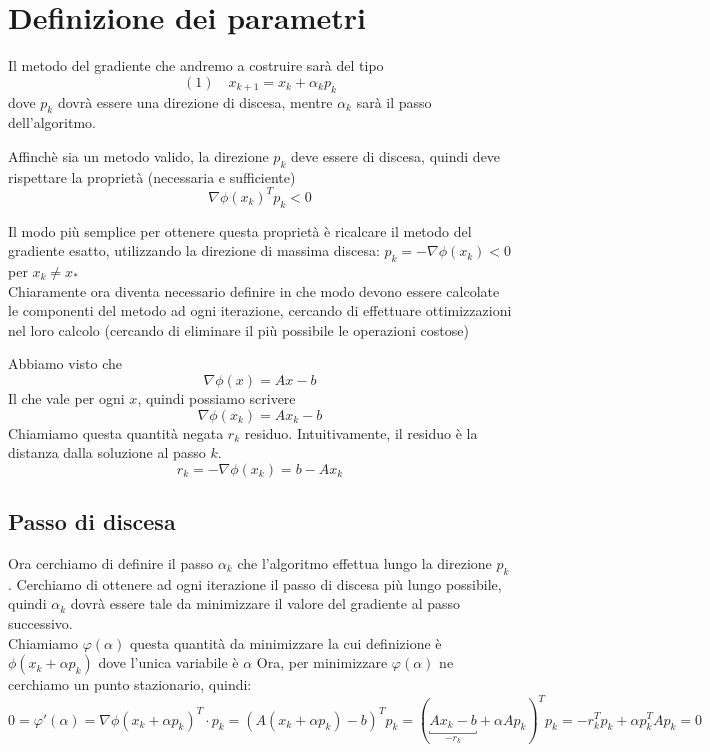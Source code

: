 \section{Definizione dei parametri} Il metodo del gradiente che
andremo a costruire sarà del tipo
$$(1) \quad  x_{k+1} = x_{k} +  \alpha_{k} p_{k}$$
dove $p_{k}$ dovrà essere una direzione di discesa, mentre
$\alpha_{k}$ sarà il passo dell'algoritmo.

Affinch\`e sia un metodo valido, la direzione $p_{k}$ deve essere di
discesa, quindi deve rispettare la proprietà (necessaria e
sufficiente) $$ \nabla \phi(x_{k})^{T} p_{k} < 0$$

Il modo più semplice per ottenere questa proprietà \`e ricalcare il
metodo del gradiente esatto, utilizzando la direzione di massima
discesa: $ p_{k} = - \nabla \phi (x_{k}) < 0 $ per $ x_{k} \neq x_{*}$
\\ Chiaramente ora diventa necessario definire in che modo devono
essere calcolate le componenti del metodo ad ogni iterazione,
cercando di effettuare ottimizzazioni nel loro calcolo (cercando di
eliminare il più possibile le operazioni costose)

Abbiamo visto che
$$\nabla \phi(x) = Ax-b$$
Il che vale per ogni $x$, quindi possiamo scrivere
$$\nabla \phi(x_{k}) = Ax_{k}-b$$
Chiamiamo questa quantità negata $r_{k}$ residuo. Intuitivamente, il residuo è la distanza dalla soluzione al passo $k$.
$$r_{k} = - \nabla \phi(x_{k}) = b - Ax_{k}$$
\subsection{Passo di discesa} Ora cerchiamo di definire il passo
$\alpha_{k}$ che l'algoritmo effettua lungo la direzione $p_{k}$.
Cerchiamo di ottenere ad ogni iterazione il passo di discesa più lungo
possibile, quindi $\alpha_{k}$ dovrà essere tale da minimizzare il
valore del gradiente al passo successivo.  \\ Chiamiamo $\varphi
(\alpha)$ questa quantità da minimizzare la cui definizione \`e
$\phi(x_{k} + \alpha p_{k})$ dove l'unica variabile \`e $\alpha$ Ora,
per minimizzare $\varphi (\alpha)$ ne cerchiamo un punto stazionario,
quindi:
$$ 0 = \varphi'(\alpha) = 
\nabla \phi (x_{k} + \alpha p_{k})^{T} \cdot p_{k} = (A (x_{k}
+ \alpha p_{k}) -b)^{T} p_{k} = ( \underbracket{A x_{k} -b}_{-r_{k}} +
\alpha A p_{k})^{T} p_{k} = - r_{k}^{T} p_{k} + \alpha p_{k}^{T} A
p_{k} = 0
$$

